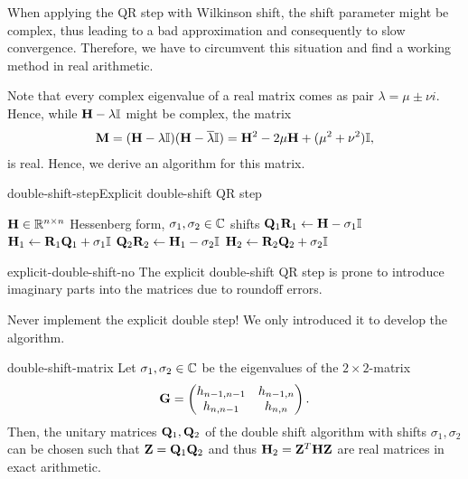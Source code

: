 \begin{intro}%
  When applying the QR step with Wilkinson shift, the shift parameter
  might be complex, thus leading to a bad approximation and
  consequently to slow convergence. Therefore, we have to circumvent
  this situation and find a working method in real arithmetic.

  
  Note that every complex eigenvalue of a real matrix comes as pair
  $\lambda = \mu \pm \nu i$. Hence, while $\mathbf H-\lambda\mathbb I$ might be
  complex, the matrix
  \begin{gather}
    \mathbf M = (\mathbf H-\lambda\mathbb I)(\mathbf H-\overline\lambda\mathbb I)
    = \mathbf H^2 - 2\mu \mathbf H + (\mu^2+\nu^2)\mathbb I,
  \end{gather}
  is real. Hence, we derive an algorithm for this matrix.
\end{intro}

\begin{Algorithm*}{double-shift-step}{Explicit double-shift QR step}
  \begin{algorithmic}[1]
    \Require $\mathbf H\in\mathbb R^{n\times n}$ Hessenberg form, $\sigma_1,\sigma_2\in\mathbb C$ shifts
    \State $\mathbf Q_1\mathbf R_1 \gets \mathbf H - \sigma_1\mathbb I$ 
    \State $\mathbf H_1 \gets \mathbf R_1\mathbf Q_1 + \sigma_1\mathbb I$
    \State $\mathbf Q_2\mathbf R_2 \gets \mathbf H_1 - \sigma_2\mathbb I$ 
    \State $\mathbf H_2 \gets \mathbf R_2\mathbf Q_2 + \sigma_2\mathbb I$
  \end{algorithmic}
\end{Algorithm*}

\begin{Remark}{explicit-double-shift-no}
  The explicit double-shift QR step is prone to introduce imaginary
  parts into the matrices due to roundoff errors.

  Never implement the explicit double step! We only introduced it to
  develop the algorithm.
\end{Remark}

\begin{Lemma}{double-shift-matrix}
  Let $\sigma_1,\sigma_2\in\mathbb C$ be the eigenvalues of the $2\times2$-matrix
  \begin{gather}
    \mathbf G =
    \begin{pmatrix}
      h_{n-1,n-1}&h_{n-1,n}\\h_{n,n-1}&h_{n,n}
    \end{pmatrix}.
  \end{gather}
  Then, the unitary matrices $\mathbf Q_1,\mathbf Q_2$ of the double shift
  algorithm with shifts $\sigma_1,\sigma_2$ can be chosen such that
  $\mathbf Z = \mathbf Q_1\mathbf Q_2$ and thus $\mathbf H_2 = \mathbf Z^T\mathbf H\mathbf Z$ are
  real matrices in exact arithmetic.
\end{Lemma}


